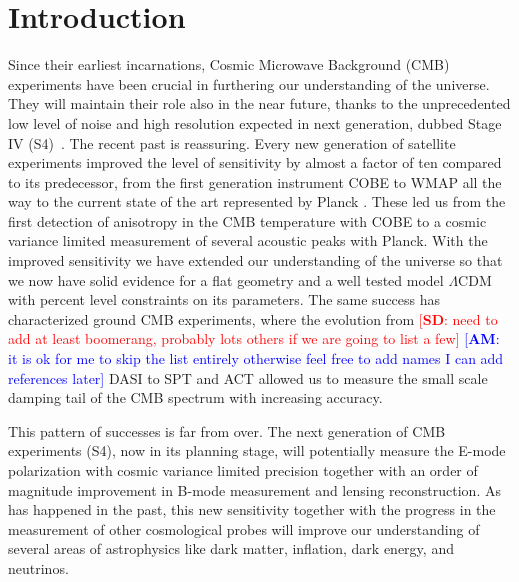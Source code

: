 \documentclass[aps,prd,reprint,superscriptaddress]{revtex4-1}
\newcommand{\sd}[1]{\textcolor{red}{[{\bf SD}: #1]}}
\newcommand{\am}[1]{\textcolor{blue}{[{\bf AM}: #1]}}
\begin{document}
\section{Introduction}\label{sec:intro}
Since their earliest incarnations, Cosmic Microwave Background (CMB) experiments have been crucial in furthering our understanding of the universe. They will maintain their role also in the near future, thanks to the unprecedented low level of noise and high resolution expected in next generation, dubbed Stage IV (S4)~\cite{2013arXiv1309.5383A}.
The recent past is  reassuring. Every new generation of satellite experiments improved the level of sensitivity by almost a factor of ten compared to its predecessor, from the first generation instrument COBE to WMAP all the way to the current state of the art represented by Planck \cite{2015arXiv150201589P,2014A&A...571A..16P,2003ApJS..148..175S,2000ApJ...545L...5H,2000Natur.404..955D}.
These led us from the first detection of anisotropy in the CMB temperature with COBE to a cosmic variance limited measurement of several acoustic peaks with Planck. With the improved sensitivity we have extended our understanding of the universe so that we now have solid evidence for a flat geometry and a well tested model $\Lambda$CDM with percent level constraints on its parameters.
The same success has characterized ground CMB experiments, where the evolution from \sd{need to add at least boomerang, probably lots others if we are going to list a few} \am{it is ok for me to skip the list entirely otherwise feel free to add names I can add references later} DASI \cite{2002ApJ...568...38H} to SPT and ACT \cite{2011ApJ...739...52D} \cite{2011ApJ...743...28K} allowed us to measure the small scale damping tail of the CMB spectrum with increasing accuracy.

This pattern of successes is far from over. The next generation of CMB experiments (S4), now in its planning stage, will potentially measure the E-mode polarization with cosmic variance limited precision together with an order of magnitude improvement in B-mode measurement and lensing reconstruction. As has happened in the past, this new sensitivity together with the progress in the measurement of other cosmological probes will improve our understanding of several areas of astrophysics like dark matter, inflation, dark energy, and neutrinos. 
\end{document}
